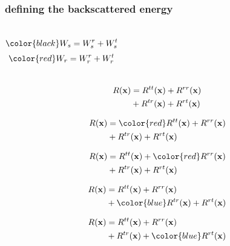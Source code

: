 \begin{frame} \frametitle{defining the backscattered energy}

\begin{columns}
\vspace{0.2in}
\[
\color{black} \US= \USr + \USt
\]
\vspace{0.3in}
\[
\color{red} \UR= \URr + \URt
\]
\end{columns}

\end{frame}





\begin{frame} 
\begin{align}
\nonumber R({\bf x}) &= R^{tt}({\bf x}) +R^{rr}({\bf x})\\
\nonumber             &+ R^{tr}({\bf x})+ R^{rt}({\bf x})
\end{align}
\end{frame}

\begin{frame} 
\begin{align}
\nonumber \R &= {\color{red} \Rc{tt}} + { \Rc{rr}}\\
\nonumber             &+ \Rc{tr}+ \Rc{rt}
\end{align}
\end{frame}


\begin{frame} 
\begin{align}
\nonumber \R &= { \Rc{tt}} + {\color{red} \Rc{rr}}\\
\nonumber             &+ \Rc{tr}+ \Rc{rt}
\end{align}
\end{frame}

\begin{frame}
\begin{align}
\nonumber \R &= { \Rc{tt}} + { \Rc{rr}}\\
\nonumber             &+ {\color{blue} \Rc{tr} }+ { \Rc{rt}}
\end{align}
\end{frame}

\begin{frame}
\begin{align}
\nonumber \R &= { \Rc{tt}} + { \Rc{rr}}\\
\nonumber             &+ { \Rc{tr} }+ {\color{blue} \Rc{rt}}
\end{align}
\end{frame}

